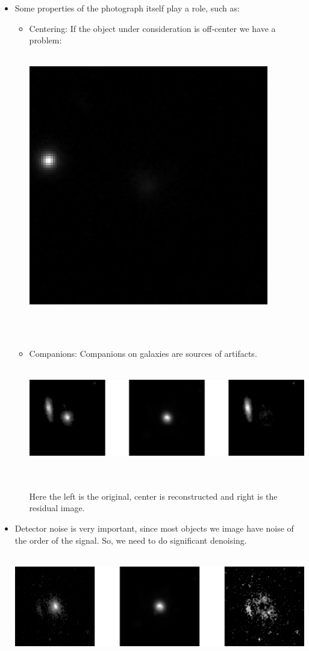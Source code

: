 \documentclass[11pt, a4paper]{article}
\begin{document}
\begin{itemize}
\item Some properties of the photograph itself play a role, such as:
	\begin{itemize}
	\item Centering: If the object under consideration is off-center we have a problem: \\ \\
	\centerline{\includegraphics[scale=0.5]{non-centered_galaxy.png}} \\ \\
	\item Companions: Companions on galaxies are sources of artifacts. \\ \\
	\centerline{\includegraphics[scale=0.3]{1223_Source_Subtraction.png}}
	\\ \\ Here the left is the original, center is reconstructed and right is the residual image.
	\end{itemize}

\item Detector noise is very important, since most objects we image have noise of the order of the signal. So, we need to do significant denoising. \\ \\
\centerline{\includegraphics[scale=0.3]{1398_noise_amp.png}}
\end{itemize}
\end{document}
